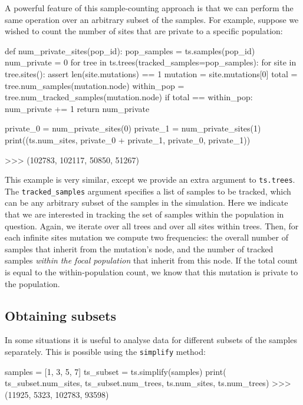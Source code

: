 \documentclass[graybox]{svmult}
\begin{document}
A powerful feature of this sample-counting approach is that we can
perform the same operation over an arbitrary subset of the samples. For
example, suppose we wished to count the number of sites that are private
to a specific population:

\begin{pythoncode}
def num_private_sites(pop_id):
    pop_samples = ts.samples(pop_id)
    num_private = 0
    for tree in ts.trees(tracked_samples=pop_samples):
        for site in tree.sites():
            assert len(site.mutations) == 1
            mutation = site.mutations[0]
            total = tree.num_samples(mutation.node)
            within_pop = tree.num_tracked_samples(mutation.node)
            if total == within_pop:
                num_private += 1
    return num_private

private_0 = num_private_sites(0)
private_1 = num_private_sites(1)
print((ts.num_sites, private_0 + private_1, private_0, private_1))

>>> (102783, 102117, 50850, 51267)
\end{pythoncode}

    This example is very similar, except we provide an extra argument to
\texttt{ts.trees}. The \texttt{tracked\_samples} argument specifies a list of samples to be tracked, which can be
any arbitrary subset of the samples in the simulation. Here we indicate
that we are interested in tracking the set of samples within the
population in question. Again, we iterate over all trees and over all
sites within trees. Then, for each infinite sites mutation we
compute two frequencies: the overall number of samples that inherit from
the mutation's node, and the number of tracked samples \emph{within the focal
population} that inherit from this node. If the total count is
equal to the within-population count, we know that this mutation is private to the population.

\subsection{Obtaining subsets}\label{obtaining-subsets}

In some situations it is useful to analyse data for different subsets of
the samples separately. This is possible using the \texttt{simplify}
method:

\begin{pythoncode}
samples = [1, 3, 5, 7]
ts_subset = ts.simplify(samples)
print(
    ts_subset.num_sites, ts_subset.num_trees,
    ts.num_sites, ts.num_trees)
>>> (11925, 5323, 102783, 93598)
\end{pythoncode}
\end{document}
